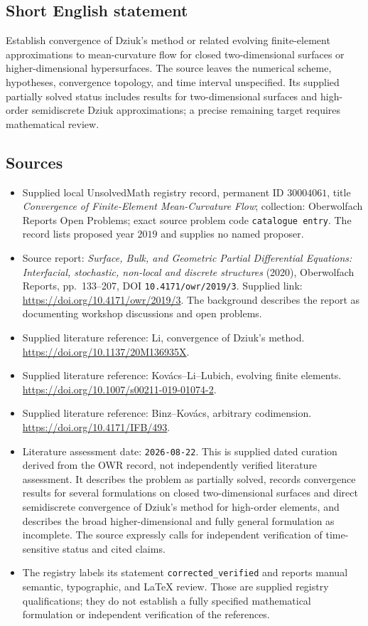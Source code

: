 \documentclass[11pt]{article}
\begin{document}
\subsection{Short English statement}
Establish convergence of Dziuk's method or related evolving finite-element approximations to mean-curvature flow for closed two-dimensional surfaces or higher-dimensional hypersurfaces. The source leaves the numerical scheme, hypotheses, convergence topology, and time interval unspecified. Its supplied partially solved status includes results for two-dimensional surfaces and high-order semidiscrete Dziuk approximations; a precise remaining target requires mathematical review.
\subsection{Sources}
\begin{itemize}
\item Supplied local UnsolvedMath registry record, permanent ID \(30004061\), title \emph{Convergence of Finite-Element Mean-Curvature Flow}; collection: Oberwolfach Reports Open Problems; exact source problem code \texttt{catalogue entry}. The record lists proposed year \(2019\) and supplies no named proposer.
\item Source report: \emph{Surface, Bulk, and Geometric Partial Differential Equations: Interfacial, stochastic, non-local and discrete structures} (2020), Oberwolfach Reports, pp.\ 133--207, DOI \texttt{10.4171/owr/2019/3}. Supplied link: \url{https://doi.org/10.4171/owr/2019/3}. The background describes the report as documenting workshop discussions and open problems.
\item Supplied literature reference: Li, convergence of Dziuk's method. \url{https://doi.org/10.1137/20M136935X}.
\item Supplied literature reference: Kovács--Li--Lubich, evolving finite elements. \url{https://doi.org/10.1007/s00211-019-01074-2}.
\item Supplied literature reference: Binz--Kovács, arbitrary codimension. \url{https://doi.org/10.4171/IFB/493}.
\item Literature assessment date: \texttt{2026-08-22}. This is supplied dated curation derived from the OWR record, not independently verified literature assessment. It describes the problem as partially solved, records convergence results for several formulations on closed two-dimensional surfaces and direct semidiscrete convergence of Dziuk's method for high-order elements, and describes the broad higher-dimensional and fully general formulation as incomplete. The source expressly calls for independent verification of time-sensitive status and cited claims.
\item The registry labels its statement \texttt{corrected\_verified} and reports manual semantic, typographic, and LaTeX review. Those are supplied registry qualifications; they do not establish a fully specified mathematical formulation or independent verification of the references.
\end{itemize}
\end{document}
